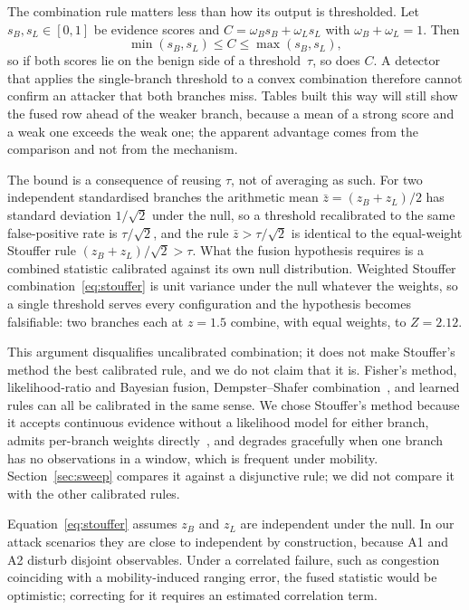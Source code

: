 The combination rule matters less than how its output is thresholded. Let
$s_B, s_L \in [0,1]$ be evidence scores and $C = \omega_B s_B + \omega_L s_L$
with $\omega_B + \omega_L = 1$. Then
\begin{equation}
\label{eq:convex}
\min(s_B, s_L) \le C \le \max(s_B, s_L),
\end{equation}
so if both scores lie on the benign side of a threshold~$\tau$, so does $C$. A
detector that applies the single-branch threshold to a convex combination
therefore cannot confirm an attacker that both branches miss. Tables built
this way will still show the fused row ahead of the weaker branch, because a
mean of a strong score and a weak one exceeds the weak one; the apparent
advantage comes from the comparison and not from the mechanism.

The bound is a consequence of reusing $\tau$, not of averaging as such. For two
independent standardised branches the arithmetic mean
$\bar z = (z_B + z_L)/2$ has standard deviation $1/\sqrt2$ under the null, so a
threshold recalibrated to the same false-positive rate is $\tau/\sqrt2$, and
the rule $\bar z > \tau/\sqrt2$ is identical to the equal-weight Stouffer rule
$(z_B + z_L)/\sqrt2 > \tau$. What the fusion hypothesis requires is a combined
statistic calibrated against its own null distribution. Weighted Stouffer
combination~\eqref{eq:stouffer} is unit variance under the null whatever the
weights, so a single threshold serves every configuration and the hypothesis
becomes falsifiable: two branches each at $z = 1.5$ combine, with equal
weights, to $Z = 2.12$.

This argument disqualifies uncalibrated combination; it does not make
Stouffer's method the best calibrated rule, and we do not claim that it is.
Fisher's method, likelihood-ratio and Bayesian fusion, Dempster--Shafer
combination~\cite{singh2020self}, and learned rules can all be calibrated in
the same sense. We chose Stouffer's method because it accepts continuous
evidence without a likelihood model for either branch, admits per-branch
weights directly~\cite{whitlock2005weighted}, and degrades gracefully when one
branch has no observations in a window, which is frequent under mobility.
Section~\ref{sec:sweep} compares it against a disjunctive rule; we did not
compare it with the other calibrated rules.

Equation~\eqref{eq:stouffer} assumes $z_B$ and $z_L$ are independent under the
null. In our attack scenarios they are close to independent by construction,
because A1 and A2 disturb disjoint observables. Under a correlated failure,
such as congestion coinciding with a mobility-induced ranging error, the fused
statistic would be optimistic; correcting for it requires an estimated
correlation term.

